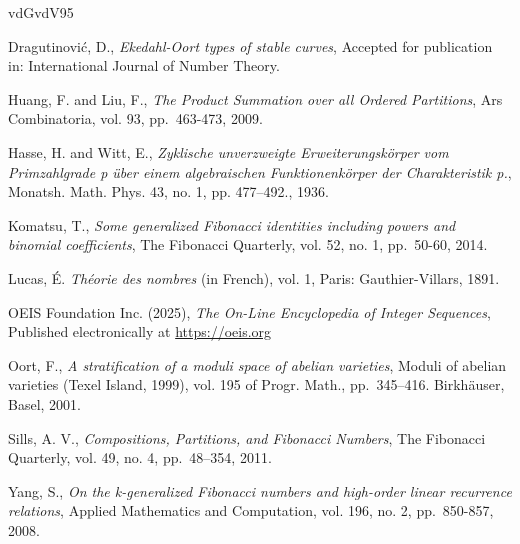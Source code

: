\documentclass[11pt]{amsart}
\numberwithin{equation}{section}
\theoremstyle{plain}
\newcommand{\<}{\left \langle}
\renewcommand{\>}{\right \rangle}
\theoremstyle{definition}
\theoremstyle{remark}
\begin{document}
\begin{thebibliography}{vdGvdV95}




{Dragutinovi\'c, D.}, \emph{Ekedahl-Oort types of stable curves}, Accepted for publication in: International Journal of Number Theory.


{Huang, F. and Liu, F.}, \emph{The Product Summation over all Ordered Partitions},
Ars Combinatoria, vol. 93, pp.~463-473, 2009. 


{Hasse, H. and Witt, E.}, \emph{Zyklische unverzweigte Erweiterungskörper vom Primzahlgrade p über einem algebraischen Funktionenkörper der Charakteristik p.},
 Monatsh. Math. Phys. 43, no. 1, pp. 477–492., 1936.  


{Komatsu, T.}, \emph{Some generalized Fibonacci identities including powers and binomial coefficients}, The Fibonacci Quarterly, vol. 52, no. 1, pp.~50-60, 2014.

{Lucas, É.} {\it Théorie des nombres} (in French), vol. 1, Paris: Gauthier-Villars, 1891.


OEIS Foundation Inc. (2025), \emph{The On-Line Encyclopedia of Integer Sequences}, Published electronically at \url{https://oeis.org}

Oort, F., \emph{A stratification of a moduli space of abelian varieties},
Moduli of abelian varieties
(Texel Island, 1999), vol. 195 of Progr. Math., pp.~345–416. Birkh\"auser, Basel, 2001.


Sills, A. V., \emph{Compositions, Partitions, and Fibonacci Numbers},
The Fibonacci Quarterly, vol. 49, no. 4, pp.~48–354, 2011.

Yang, S., \emph{On the k-generalized Fibonacci numbers and high-order linear recurrence relations},
Applied Mathematics and Computation,
vol. 196, no. 2, pp.~850-857, 2008.


\end{thebibliography} 
\end{document}
